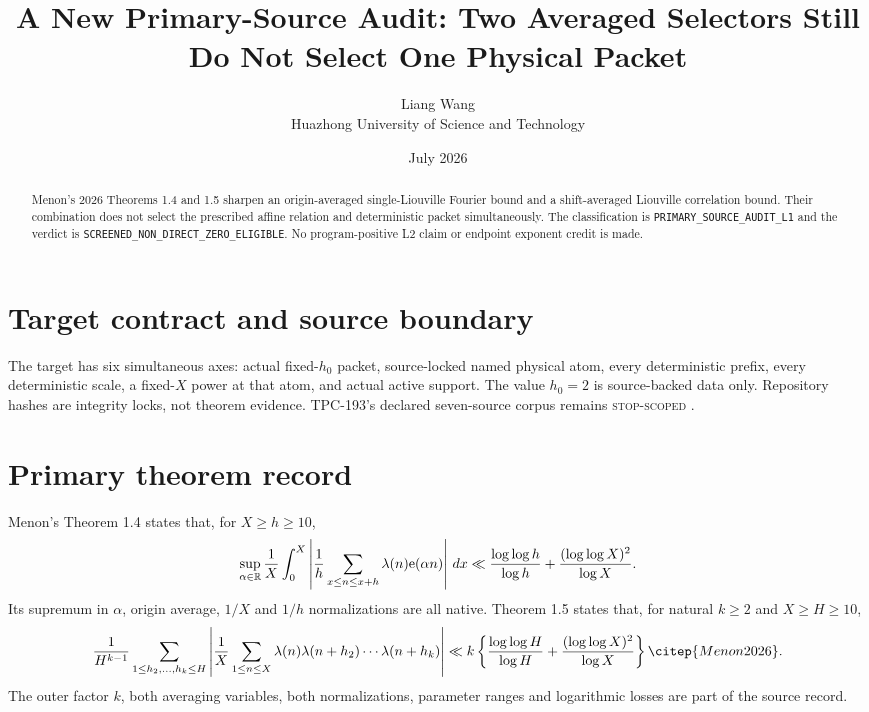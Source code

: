\documentclass[11pt]{article}
\title{\textbf{A New Primary-Source Audit: Two Averaged Selectors Still Do Not Select One Physical Packet}}
\author{Liang Wang\\Huazhong University of Science and Technology}
\date{July 2026}
\newcommand{\e}{\mathrm{e}}
\begin{document}
\maketitle
\begin{abstract}
Menon's 2026 Theorems 1.4 and 1.5 sharpen an origin-averaged single-Liouville Fourier bound and a shift-averaged Liouville correlation bound.  Their combination does not select the prescribed affine relation and deterministic packet simultaneously.
The classification is \texttt{PRIMARY\_\allowbreak{}SOURCE\_\allowbreak{}AUDIT\_\allowbreak{}L1} and the
verdict is \texttt{SCREENED\_\allowbreak{}NON\_\allowbreak{}DIRECT\_\allowbreak{}ZERO\_\allowbreak{}ELIGIBLE}.  No program-positive L2
claim or endpoint exponent credit is made.
\end{abstract}

\section{Target contract and source boundary}
The target has six simultaneous axes: actual fixed-\(h_0\) packet,
source-locked named physical atom, every deterministic prefix, every
deterministic scale, a fixed-\(X\) power at that atom, and actual active
support.  The value \(h_0=2\) is source-backed data only.  Repository hashes
are integrity locks, not theorem evidence.  TPC-193's declared seven-source
corpus remains \textsc{stop-scoped} \citep{WangTPC193}.


\section{Primary theorem record}
Menon's Theorem 1.4 states that, for \(X\ge h\ge10\),
\[
\sup_{\alpha\in\mathbb R}{1\over X}\int_0^X
\left|{1\over h}\sum_{x\le n\le x+h}
\lambda(n)\e(\alpha n)\right|\,dx
\ll
 {\log\log h\over\log h}
 +{(\log\log X)^2\over\log X}.
\]
Its supremum in \(\alpha\), origin average, \(1/X\) and \(1/h\)
normalizations are all native.  Theorem 1.5 states that, for natural
\(k\ge2\) and \(X\ge H\ge10\),
\[
{1\over H^{k-1}}
\sum_{1\le h_2,\ldots,h_k\le H}
\left|{1\over X}\sum_{1\le n\le X}
\lambda(n)\lambda(n+h_2)\cdots\lambda(n+h_k)\right|
\ll
k\left\{{\log\log H\over\log H}
+{(\log\log X)^2\over\log X}\right\}
\citep{Menon2026}.
\]
The outer factor \(k\), both averaging variables, both normalizations,
parameter ranges and logarithmic losses are part of the source record.
\end{document}
